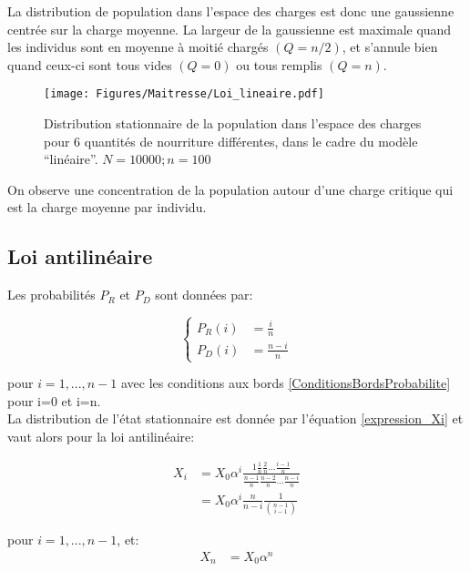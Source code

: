 La distribution de population dans l'espace des charges est donc une gaussienne centrée sur la charge moyenne. La largeur de la gaussienne est maximale quand les individus sont en moyenne à moitié chargés $(Q=n/2)$, et s'annule bien quand ceux-ci sont tous vides $(Q=0)$ ou tous remplis $(Q=n)$.


\begin{figure}[h]
\centering
\texttt{[image: Figures/Maitresse/Loi\_lineaire.pdf]}
\caption{Distribution stationnaire de la population dans l'espace des charges pour 6 quantités de nourriture différentes, dans le cadre du modèle ``linéaire''. $N=10000; n=100$}
\label{DistribAnalytiqueLin}
\end{figure}

On observe une concentration de la population autour d'une charge critique qui est la charge moyenne par individu.



\subsection{Loi antilinéaire}
Les probabilités $P_R$ et $P_D$ sont données par:

\begin{equation}
\left \{
\begin{aligned}
P_R(i) &= \frac{i}{n}\\
P_D(i) &= \frac{n-i}{n}
\end{aligned}
\right.
\end{equation}

pour $i=1,...,n-1$ avec les conditions aux bords \ref{ConditionsBordsProbabilite} pour i=0 et i=n.\\

La distribution de l'état stationnaire est donnée par l'équation \ref{expression_Xi} et vaut alors pour la loi antilinéaire:

\begin{equation}
\begin{aligned}
X_i&=X_0 \alpha^i \frac{1\frac{1}{n}\frac{2}{n}...\frac{i-1}{n}}{\frac{n-1}{n}\frac{n-2}{n}...\frac{n-i}{n}}\\
&=X_0 \alpha^i \frac{n}{n-i}\frac{1}{\binom{n-1}{i-1}}
\end{aligned}
\end{equation}

pour $i=1,...,n-1$, et:
\begin{equation}
\begin{aligned}
X_n&=X_0 \alpha^n
\end{aligned}
\end{equation}


